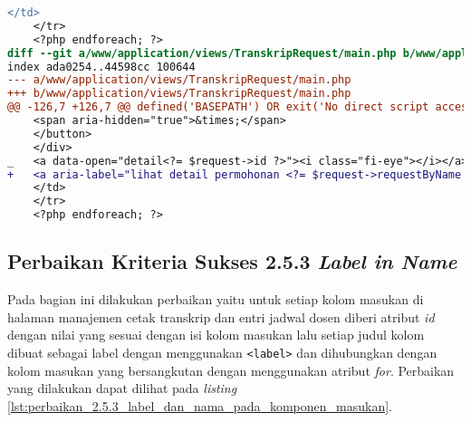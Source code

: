 \begin{lstlisting}[frame=single, label={lst:perbaikan_2.4.4_tautan_tanpa_keterangan}, language=diff, caption=Perbaikan Kriteria Sukses 2.4.4]
    </td>
    </tr>
    <?php endforeach; ?>
diff --git a/www/application/views/TranskripRequest/main.php b/www/application/views/TranskripRequest/main.php
index ada0254..44598cc 100644
--- a/www/application/views/TranskripRequest/main.php
+++ b/www/application/views/TranskripRequest/main.php
@@ -126,7 +126,7 @@ defined('BASEPATH') OR exit('No direct script access allowed');
    <span aria-hidden="true">&times;</span>
    </button>
    </div>
_   <a data-open="detail<?= $request->id ?>"><i class="fi-eye"></i></a>
+   <a aria-label="lihat detail permohonan <?= $request->requestByName ?>" data-open="detail<?= $request->id ?>"><i class="fi-eye"></i></a>
    </td>
    </tr>
    <?php endforeach; ?>
\end{lstlisting}

\subsection{Perbaikan Kriteria Sukses 2.5.3 \textit{Label in Name}}
\label{subsec:perbaikan_kriteria_sukses_2.5.3}
Pada bagian ini dilakukan perbaikan yaitu untuk setiap kolom masukan di halaman manajemen cetak transkrip dan entri jadwal dosen diberi atribut \textit{id} dengan nilai yang sesuai dengan isi kolom masukan lalu setiap judul kolom dibuat sebagai label dengan menggunakan \texttt{<label>} dan dihubungkan dengan kolom masukan yang bersangkutan dengan menggunakan atribut \textit{for}. Perbaikan yang dilakukan dapat dilihat pada \textit{listing} \ref{lst:perbaikan_2.5.3_label_dan_nama_pada_komponen_masukan}.

